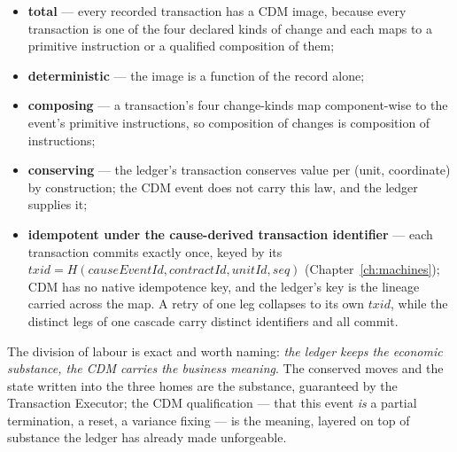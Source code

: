 \documentclass[11pt,a4paper]{article}
\begin{document}
\begin{itemize}[nosep,leftmargin=1.4em]
  \item \textbf{total} --- every recorded transaction has a CDM image, because
        every transaction is one of the four declared kinds of change and each
        maps to a primitive instruction or a qualified composition of them;
  \item \textbf{deterministic} --- the image is a function of the record alone;
  \item \textbf{composing} --- a transaction's four change-kinds map
        component-wise to the event's primitive instructions, so composition of
        changes is composition of instructions;
  \item \textbf{conserving} --- the ledger's transaction conserves value per
        (unit, coordinate) by construction; the CDM event does not carry this
        law, and the ledger supplies it;
  \item \textbf{idempotent under the cause-derived transaction identifier} --- each
        transaction commits exactly once, keyed by its
        $\mathit{txid}=H(\mathit{causeEventId},\mathit{contractId},\mathit{unitId},\mathit{seq})$
        (Chapter~\ref{ch:machines}); CDM has no native idempotence key, and the
        ledger's key is the lineage carried across the map. A retry of one leg
        collapses to its own $\mathit{txid}$, while the distinct legs of one cascade
        carry distinct identifiers and all commit.
\end{itemize}

The division of labour is exact and worth naming: \emph{the ledger keeps the
economic substance, the CDM carries the business meaning}. The conserved moves
and the state written into the three homes are the substance, guaranteed by the
Transaction Executor; the CDM qualification --- that this event \emph{is} a
partial termination, a reset, a variance fixing --- is the meaning, layered on
top of substance the ledger has already made unforgeable.
\end{document}
